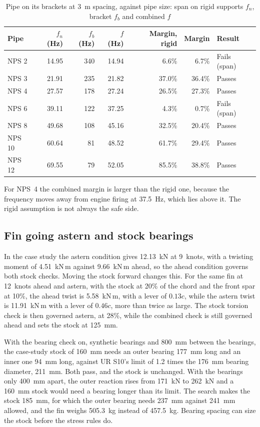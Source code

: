 \begin{table}[H]
\centering
\caption{Pipe on its brackets at 3~m spacing, against pipe size: span on rigid supports $f_n$, bracket $f_b$ and combined $f$}
\label{tab:flexibility}
\small
\begin{tabular}{lrrrrrl}
\toprule
\textbf{Pipe} & \textbf{$f_n$ (Hz)} & \textbf{$f_b$ (Hz)} & \textbf{$f$ (Hz)} & \textbf{Margin, rigid} & \textbf{Margin} & \textbf{Result}\\
\midrule
NPS 2 & 14.95 & 340 & 14.94 & 6.6\% & 6.7\% & Fails (span)\\
NPS 3 & 21.91 & 235 & 21.82 & 37.0\% & 36.4\% & Passes\\
NPS 4 & 27.57 & 178 & 27.24 & 26.5\% & 27.3\% & Passes\\
NPS 6 & 39.11 & 122 & 37.25 & 4.3\% & 0.7\% & Fails (span)\\
NPS 8 & 49.68 & 108 & 45.16 & 32.5\% & 20.4\% & Passes\\
NPS 10 & 60.64 & 81 & 48.52 & 61.7\% & 29.4\% & Passes\\
NPS 12 & 69.55 & 79 & 52.05 & 85.5\% & 38.8\% & Passes\\
\bottomrule
\end{tabular}
\end{table}

For NPS~4 the combined margin is larger than the rigid one, because the
frequency moves away from engine firing at 37.5~Hz, which lies above it. The
rigid assumption is not always the safe side.

\subsection{Fin going astern and stock bearings}

In the case study the astern condition gives 12.13~kN at 9~knots, with a
twisting moment of 4.51~kN\,m against 9.66~kN\,m ahead, so the ahead
condition governs both stock checks. Moving the stock forward changes this. For
the same fin at 12~knots ahead and astern, with the stock at 20\% of the chord
and the front spar at 10\%, the ahead twist is 5.58~kN\,m, with a lever of $0.13c$, while the astern
twist is 11.91~kN\,m with a lever of $0.46c$, more than twice as large. The
stock torsion check is then governed astern, at 28\%, while the combined check
is still governed ahead and sets the stock at 125~mm.

With the bearing check on, synthetic bearings and 800~mm between the bearings,
the case-study stock of 160~mm needs an outer bearing 177~mm long and an inner
one 94~mm long, against UR S10's limit of 1.2 times the 176~mm bearing
diameter, 211~mm. Both pass, and the stock is unchanged. With the bearings
only 400~mm apart, the outer reaction rises from 171~kN to 262~kN and a 160~mm
stock would need a bearing longer than its limit. The search makes the stock
185~mm, for which the outer bearing needs 237~mm against 241~mm allowed, and
the fin weighs 505.3~kg instead of 457.5~kg. Bearing spacing can size the stock
before the stress rules do.

